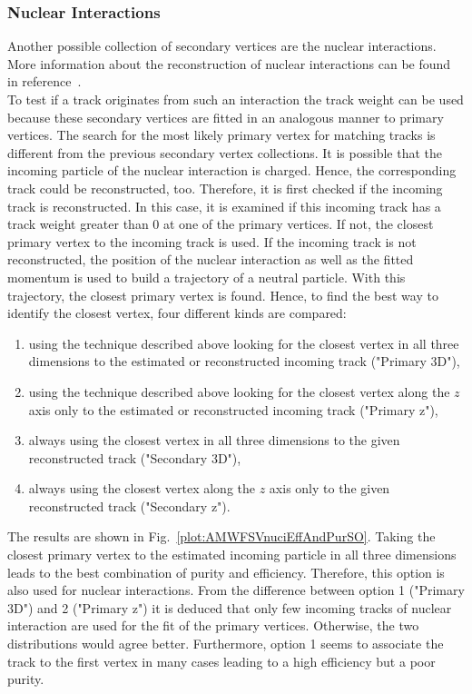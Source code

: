 \subsubsection{Nuclear Interactions \label{sec:AMWFSVni}}

Another possible collection of secondary vertices are the nuclear interactions. More information about the reconstruction of nuclear interactions can be found in reference~. \\
To test if a track originates from such an interaction the track weight can be used because these secondary vertices are fitted in an analogous manner to primary vertices. The search for the most likely primary vertex for matching tracks is different from the previous secondary vertex collections. It is possible that the incoming particle of the nuclear interaction is charged. Hence, the corresponding track could be reconstructed, too. Therefore, it is first checked if the incoming track is reconstructed. In this case, it is examined if this incoming track has a track weight greater than 0 at one of the primary vertices. If not, the closest primary vertex to the incoming track is used. If the incoming track is not reconstructed, the position of the nuclear interaction as well as the fitted momentum is used to build a trajectory of a neutral particle. With this trajectory, the closest primary vertex is found. Hence, to find the best way to identify the closest vertex, four different kinds are compared:
\begin{enumerate}
    \item using the technique described above looking for the closest vertex in all three dimensions to the estimated or reconstructed incoming track ("Primary 3D"),
    \item using the technique described above looking for the closest vertex along the $z$ axis only to the estimated or reconstructed incoming track ("Primary z"),
    \item always using the closest vertex in all three dimensions to the given reconstructed track ("Secondary 3D"),
    \item always using the closest vertex along the $z$ axis only to the given reconstructed track ("Secondary z").
\end{enumerate}
The results are shown in Fig.~\ref{plot:AMWFSVnuciEffAndPurSO}. Taking the closest primary vertex to the estimated incoming particle in all three dimensions leads to the best combination of purity and efficiency. Therefore, this option is also used for nuclear interactions. From the difference between option 1 ("Primary 3D") and 2 ("Primary z") it is deduced that only few incoming tracks of nuclear interaction are used for the fit of the primary vertices. Otherwise, the two distributions would agree better. Furthermore, option 1 seems to associate the track to the first vertex in many cases leading to a high efficiency but a poor purity.

